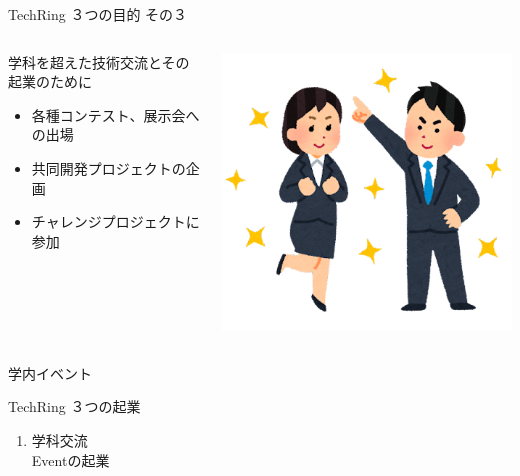 \documentclass[dvipdfmx]{beamer}
\begin{document}
\begin{frame}{TechRing ３つの目的 その３}

  \begin{columns}[totalwidth=\textwidth]
    \begin{column}{0.7\textwidth}
      \begin{greyblock}{学科を超えた技術交流とその起業のために}
        \vspace{1mm}
        \begin{itemize}
          \item \alert{各種コンテスト、展示会への出場}
          \item \alert{共同開発プロジェクトの企画}
          \item \alert{チャレンジプロジェクトに参加}
        \end{itemize}
        \end{greyblock}
    \end{column}
    \begin{column}{0.25\textwidth}
      \includegraphics[scale=.25]{pic/mokuhyou3.png}
    \end{column}
  \end{columns}

  \begin{columns}
    \begin{column}{0.30\textwidth}
      \begin{block}{学内イベント}
        \begin{footnotesize}
          TechRing ３つの起業
          \begin{enumerate}
            \item 学科交流\\Eventの起業
          \end{enumerate}
        \end{footnotesize}
      \end{block}
    \end{column}


\end{columns}
\end{frame}
\end{document}
